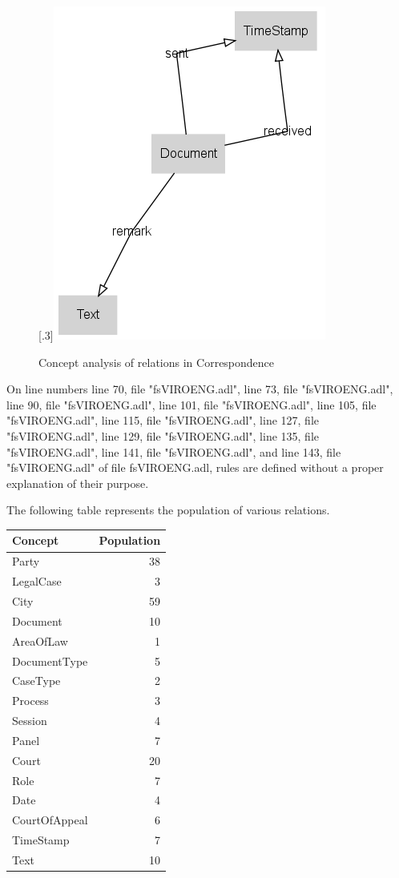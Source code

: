 \documentclass[10pt,a4paper]{report}              %
\theoremstyle{plain}\theorembodyfont{\rmfamily}\newtheorem{definition}{Definition}[section]
\theoremstyle{plain}\theorembodyfont{\rmfamily}\newtheorem{designrule}[definition]{Requirement}
\begin{document}
\begin{figure}[htb]
\begin{center}
\scalebox{.3}[.3]{\includegraphics{LatCorrespondence}}
\caption{Concept analysis of relations in Correspondence}
\label{fig:LatCorrespondence}
\end{center}
\end{figure}
On line numbers line 70, file "fsVIROENG.adl", line 73, file "fsVIROENG.adl", line 90, file "fsVIROENG.adl", line 101, file "fsVIROENG.adl", line 105, file "fsVIROENG.adl", line 115, file "fsVIROENG.adl", line 127, file "fsVIROENG.adl", line 129, file "fsVIROENG.adl", line 135, file "fsVIROENG.adl", line 141, file "fsVIROENG.adl", and line 143, file "fsVIROENG.adl" of file fsVIROENG.adl, rules are defined without a proper explanation of their purpose. 

The following table represents the population of various relations. 

\begin{center}
\begin{tabular}{lr}
Concept & Population\\
\hline
Party & 38\\
LegalCase & 3\\
City & 59\\
Document & 10\\
AreaOfLaw & 1\\
DocumentType & 5\\
CaseType & 2\\
Process & 3\\
Session & 4\\
Panel & 7\\
Court & 20\\
Role & 7\\
Date & 4\\
CourtOfAppeal & 6\\
TimeStamp & 7\\
Text & 10\\
\end{tabular}
\end{center}
\end{document}
